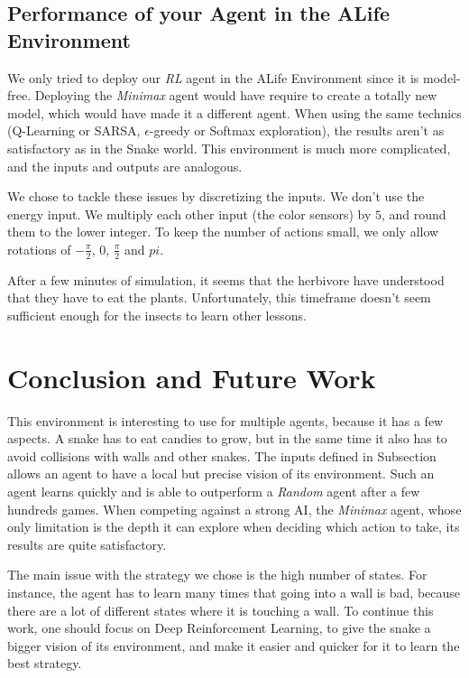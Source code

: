 \documentclass[journal, a4paper]{IEEEtran}
\begin{document}
\subsection{Performance of your Agent in the ALife Environment}

We only tried to deploy our \emph{RL} agent in the ALife Environment since it is model-free.
Deploying the \emph{Minimax} agent would have require to create a totally new model, which would have made it a different agent.
When using the same technics (Q-Learning or SARSA, $\epsilon$-greedy or Softmax exploration), the results aren't as satisfactory as in the Snake world.
This environment is much more complicated, and the inputs and outputs are analogous.

We chose to tackle these issues by discretizing the inputs.
We don't use the energy input.
We multiply each other input (the color sensors) by $5$, and round them to the lower integer.
To keep the number of actions small, we only allow rotations of $-\frac{\pi}{2}$, $0$, $\frac{\pi}{2}$ and $pi$.

After a few minutes of simulation, it seems that the herbivore have understood that they have to eat the plants.
Unfortunately, this timeframe doesn't seem sufficient enough for the insects to learn other lessons.

\section{Conclusion and Future Work}
    This environment is interesting to use for multiple agents, because it has a few aspects.
    A snake has to eat candies to grow, but in the same time it also has to avoid collisions with walls and other snakes.
    The inputs defined in Subsection~\cite{rl_agent} allows an agent to have a local but precise vision of its environment.
    Such an agent learns quickly and is able to outperform a \emph{Random} agent after a few hundreds games.
    When competing against a strong AI, the \emph{Minimax} agent, whose only limitation is the depth it can explore when deciding which action to take, its results are quite satisfactory.

    The main issue with the strategy we chose is the high number of states.
    For instance, the agent has to learn many times that going into a wall is bad, because there are a lot of different states where it is touching a wall.
    To continue this work, one should focus on Deep Reinforcement Learning, to give the snake a bigger vision of its environment, and make it easier and quicker for it to learn the best strategy.
\end{document}
